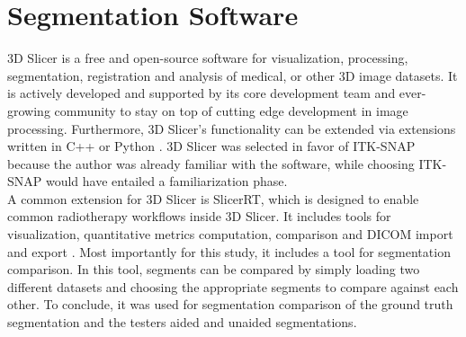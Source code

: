 \section{Segmentation Software}\label{s:segSoftware}
3D Slicer is a free and open-source software for visualization, processing, segmentation, registration and analysis of medical, or other 3D image datasets.
It is actively developed and supported by its core development team and ever-growing community to stay on top of cutting edge development in image processing.
Furthermore, 3D Slicer's functionality can be extended via extensions written in C++ or Python \cite{kikinis3DSlicerPlatform2014}.
3D Slicer was selected in favor of ITK-SNAP because the author was already familiar with the software, while choosing ITK-SNAP would have entailed a familiarization phase.\\
A common extension for 3D Slicer is SlicerRT, which is designed to enable common radiotherapy workflows inside 3D Slicer.
It includes tools for visualization, quantitative metrics computation, comparison and DICOM import and export \cite{pinterSlicerRTRadiationTherapy2012}.
Most importantly for this study, it includes a tool for segmentation comparison.
In this tool, segments can be compared by simply loading two different datasets and choosing the appropriate segments to compare against each other.
To conclude, it was used for segmentation comparison of the ground truth segmentation and the testers aided and unaided segmentations.

